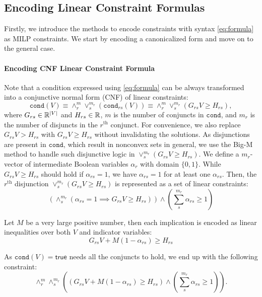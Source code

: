 \documentclass[sigconf]{acmart}
\newcommand{\true}{\mathsf{true}}
\begin{document}
\subsection{Encoding Linear Constraint Formulas}\label{section:milp:disjunctive}
Firstly, we introduce the methods to encode constraints with syntax \eqref{eq:formula} as MILP constraints. We start by encoding a canonicalized form and move on to the general case. 

\paragraph{Encoding CNF Linear Constraint Formula} Note that a condition expressed using \eqref{eq:formula} can be always transformed into a conjunctive normal form (CNF) of linear constraints:
\begin{equation}
    \texttt{cond}(V) \equiv \land_r^m \lor_s^{m_r} (\texttt{cond}_{rs}(V)) \equiv \land_r^m \lor_s^{m_r} (G_{rs} V \geq H_{rs}),    
\end{equation}
where $G_{rs} \in \mathbb{R}^{|V|}$ and $H_{rs} \in \mathbb{R}$, $m$ is the number of conjuncts in $\texttt{cond}$, and $m_r$ is the number of disjuncts in the $r^{\text{th}}$ conjunct. For convenience, we also replace $G_{rs}V > H_{rs}$ with $G_{rs}V \geq H_{rs}$ without invalidating the solutions. As disjunctions are present in $\texttt{cond}$, which result in nonconvex sets in general, we use the Big-M method to handle such disjunctive logic in  $\lor_s^{m_r} (G_{rs} V \geq H_{rs})$. We define a $m_r$-vector of intermediate Boolean variables $\alpha_r$ with domain $\{0,1\}$. While $G_{rs} V \geq H_{rs}$ should hold if $\alpha_{rs} = 1$, we have $\alpha_{rs} = 1$ for at least one $\alpha_{rs}$. Then, the $r^\text{th}$ disjunction $\lor_s^{m_r} (G_{rs} V \geq H_{rs})$ is represented as a set of linear constraints:
\begin{equation}
  \left( \land_s^{m_r} \left(  \alpha_{rs} = 1  \implies G_{rs} V \geq H_{rs} \right) \right) \land  \left( \sum_s^{m_r} \alpha_{rs} \geq 1 \right)   
\end{equation}

Let $M$ be a very large positive number, then each implication is encoded as linear inequalities over both $V$ and indicator variables:
\begin{equation}
G_{rs}V + M(1-\alpha_{rs}) \geq H_{rs}
\end{equation}

As $\texttt{cond}(V) = \true$ needs all the conjuncts to hold, we end up with the following constraint:
\begin{equation}\label{eq:cnf}
    \land_r^m \land_s^{m_r}  \left( \left( G_{rs}V + M \left( 1-\alpha_{rs} \right) \geq H_{rs} \right) \land  \left( \sum_s^{m_r} \alpha_{rs} \geq 1 \right) \right).
\end{equation}
\end{document}
